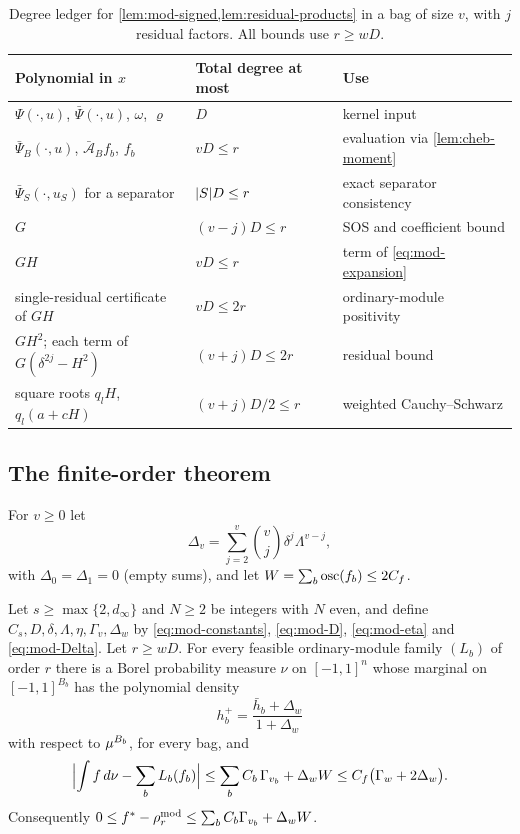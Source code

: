 \begin{table}[t]
\centering
\caption{Degree ledger for \cref{lem:mod-signed,lem:residual-products} in a
bag of size $v$, with $j$ residual factors. All bounds use $r\ge wD$.}
\label{tab:mod-ledger}
\begin{tabular}{@{}lll@{}}
\toprule
Polynomial in $x$ & Total degree at most & Use\\
\midrule
$\Psi(\cdot,u)$, $\bar\Psi(\cdot,u)$, $\omega$, $\varrho$ & $D$ & kernel input\\
$\bar\Psi_B(\cdot,u)$, $\bar{\mathcal A}_Bf_b$, $f_b$ & $vD\le r$ & evaluation via \cref{lem:cheb-moment}\\
$\bar\Psi_S(\cdot,u_S)$ for a separator & $\lvert S\rvert D\le r$ & exact separator consistency\\
$G$ & $(v-j)D\le r$ & SOS and coefficient bound\\
$GH$ & $vD\le r$ & term of \eqref{eq:mod-expansion}\\
single-residual certificate of $GH$ & $vD\le2r$ & ordinary-module positivity\\
$GH^2$; each term of $G(\delta^{2j}-H^2)$ & $(v+j)D\le2r$ & residual bound\\
square roots $q_lH$, $q_l(a+cH)$ & $(v+j)D/2\le r$ & weighted Cauchy--Schwarz\\
\bottomrule
\end{tabular}
\end{table}

\subsection{The finite-order theorem}\label{sec:mod-theorem}

For $v\ge0$ let
\begin{equation}\label{eq:mod-Delta}
  \Delta_v=\sum_{j=2}^v\binom vj\delta^j\Lambda^{v-j},
\end{equation}
with $\Delta_0=\Delta_1=0$ (empty sums), and let
$W=\sum_b\operatorname{osc}(f_b)\le2C_f$.

\begin{theorem}\label{thm:mod}
Let $s\ge\max\{2,d_\infty\}$ and $N\ge2$ be integers with $N$ even, and
define $C_s,D,\delta,\Lambda,\eta,\Gamma_v,\Delta_w$ by
\eqref{eq:mod-constants}, \eqref{eq:mod-D}, \eqref{eq:mod-eta} and
\eqref{eq:mod-Delta}. Let $r\ge wD$. For every feasible ordinary-module
family $(L_b)$ of order $r$ there is a Borel probability measure $\nu$ on
$[-1,1]^n$ whose marginal on $[-1,1]^{B_b}$ has the polynomial density
\begin{equation}\label{eq:mod-corrected}
  h_b^+=\frac{\bar h_b+\Delta_w}{1+\Delta_w}
\end{equation}
with respect to $\mu^{B_b}$, for every bag, and
\begin{equation}\label{eq:mod-rounding}
  \Bigl\lvert\int f\,d\nu-\sum_bL_b(f_b)\Bigr\rvert
  \le\sum_bC_b\,\Gamma_{v_b}+\Delta_wW
  \le C_f\bigl(\Gamma_w+2\Delta_w\bigr).
\end{equation}
Consequently $0\le f^{*}-\rho^{\mathrm{mod}}_r\le\sum_bC_b\Gamma_{v_b}+\Delta_wW$.
\end{theorem}

